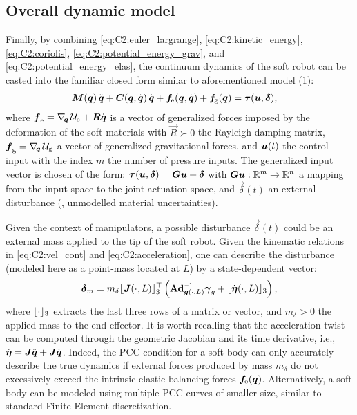 \subsection{Overall dynamic model}
\noindent Finally, by combining \eqref{eq:C2:euler_largrange}, \eqref{eq:C2:kinetic_energy}, \eqref{eq:C2:coriolis}, \eqref{eq:C2:potential_energy_grav}, and \eqref{eq:C2:potential_energy_elas}, the continuum dynamics of the soft robot can be casted into the familiar closed form
\cite{DellaSantina2020,Boyer2021,Renda2018} similar to aforementioned model (1):
%
\begin{align}
\boldsymbol{M}({\boldsymbol{q}})\,{\ddot{\boldsymbol{q}}} + \boldsymbol{C}({\boldsymbol{q}},{\dot{\boldsymbol{q}}})\,{\dot{\boldsymbol{q}}} + {\boldsymbol{f}}\!_{\scriptstyle\textrm{e}}({\boldsymbol{q}},{\dot{\boldsymbol{q}}}) + {\boldsymbol{f}}\!_{\scriptstyle\textrm{g}}({\boldsymbol{q}}) & = \boldsymbol{\tau}({\boldsymbol{u}},\boldsymbol{\delta}),
\label{eq:C2:dynamic_model}
\end{align}
%
where ${\boldsymbol{f}}_{\scriptstyle\textrm{e}} = \nabla_{\!{\boldsymbol{q}}}\,\mathcal{U}_{\textrm{e}} + \boldsymbol{R}{\dot{\boldsymbol{q}}}$ is a vector of generalized forces imposed by the deformation of the soft materials with $\vec{R} \succ 0$ the Rayleigh damping matrix,
$\boldsymbol{f}_{\scriptstyle\textrm{g}} = \nabla_{\!{\boldsymbol{q}}}\, \mathcal{U}_{\scriptstyle\textrm{g}}$ a vector of generalized gravitational forces, and
${\boldsymbol{u}}(t)$ the control input with the index
$m$ the number of pressure inputs. The generalized input vector is chosen of the form:
$\boldsymbol{\tau}({\boldsymbol{u}},\boldsymbol{\delta}) = \boldsymbol{G}{\boldsymbol{u}} + \boldsymbol{\delta}$ with $\boldsymbol{G} {\boldsymbol{u}}: \mathbb{R}^m \to \mathbb{R}^n$ a mapping from the input space to the joint actuation space, and $\vec{\delta}(t)$ an external disturbance (\eg, unmodelled material uncertainties).
%
\begin{rmk}
Given the context of manipulators, a possible disturbance $\vec{\delta}(t)$ could be an external mass applied to the tip of the soft robot. Given the kinematic relations in \eqref{eq:C2:vel_cont} and \eqref{eq:C2:acceleration}, one can describe the disturbance (modeled here as a point-mass located at $L$) by a state-dependent vector:
%
\begin{equation}
\vec{\delta}_m = m_\delta \floor{\JB(\cdot,L)}_3^\top\left({\normalfont \Ad}_{\gB(\cdot,L)}\inv\gammaB_g + \floor{\dot{\etaB}(\cdot,L)}_3 \right),
\label{eq:C2:delta_payload}
\end{equation}
%
where $\lfloor\cdot\rfloor_3$ extracts the last three rows of a matrix or vector, and $m_\delta > 0$ the applied mass to the end-effector. It is worth recalling that the acceleration twist can be computed through the geometric Jacobian and its time derivative, i.e., $\dot{{\boldsymbol{\eta}}} = {\boldsymbol{J}}{\ddot{\boldsymbol{q}}} + {\boldsymbol{J}}{\dot{\boldsymbol{q}}}$. Indeed, the PCC condition for a soft body can only accurately describe the true dynamics if external forces produced by mass $m_\delta$ do not excessively exceed the intrinsic elastic balancing forces $\boldsymbol{f}\!_{\scriptstyle\textrm{e}}({\boldsymbol{q}})$. Alternatively, a soft body can be modeled using multiple PCC curves of smaller size, similar to standard Finite Element discretization.
\end{rmk}

